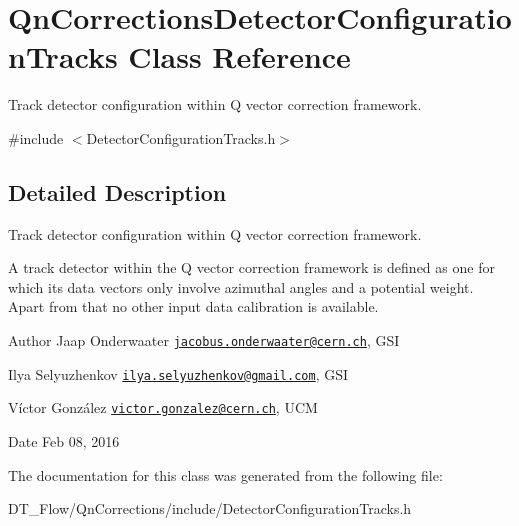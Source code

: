 \hypertarget{classQnCorrectionsDetectorConfigurationTracks}{}\section{Qn\+Corrections\+Detector\+Configuration\+Tracks Class Reference}
\label{classQnCorrectionsDetectorConfigurationTracks}


Track detector configuration within Q vector correction framework.  




{\ttfamily \#include $<$Detector\+Configuration\+Tracks.\+h$>$}



\subsection{Detailed Description}
Track detector configuration within Q vector correction framework. 

A track detector within the Q vector correction framework is defined as one for which its data vectors only involve azimuthal angles and a potential weight. Apart from that no other input data calibration is available.

\begin{DoxyAuthor}{Author}
Jaap Onderwaater \href{mailto:jacobus.onderwaater@cern.ch}{\tt jacobus.\+onderwaater@cern.\+ch}, G\+SI 

Ilya Selyuzhenkov \href{mailto:ilya.selyuzhenkov@gmail.com}{\tt ilya.\+selyuzhenkov@gmail.\+com}, G\+SI 

Víctor González \href{mailto:victor.gonzalez@cern.ch}{\tt victor.\+gonzalez@cern.\+ch}, U\+CM 
\end{DoxyAuthor}
\begin{DoxyDate}{Date}
Feb 08, 2016 
\end{DoxyDate}


The documentation for this class was generated from the following file\+:\begin{DoxyCompactItemize}
\item 
D\+T\+\_\+\+Flow/\+Qn\+Corrections/include/Detector\+Configuration\+Tracks.\+h\end{DoxyCompactItemize}
